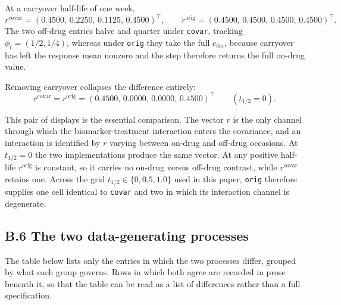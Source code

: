 \documentclass[
  11pt,
]{article}
\begin{document}
At a carryover half-life of one week,
\[
r^{\text{covar}} = (0.4500,\, 0.2250,\, 0.1125,\, 0.4500)^{\top},
\qquad
r^{\text{orig}} = (0.4500,\, 0.4500,\, 0.4500,\, 0.4500)^{\top}.
\]
The two off-drug entries halve and quarter under \texttt{covar},
tracking \(\phi_t = (1/2, 1/4)\), whereas under \texttt{orig} they take
the full \(c_{bm}\), because carryover has left the response mean
nonzero and the step therefore returns the full on-drug value.

Removing carryover collapses the difference entirely:
\[
r^{\text{covar}} = r^{\text{orig}} =
(0.4500,\, 0.0000,\, 0.0000,\, 0.4500)^{\top}
\qquad (t_{1/2} = 0).
\]

This pair of displays is the essential comparison. The vector \(r\) is
the only channel through which the biomarker-treatment interaction
enters the covariance, and an interaction is identified by \(r\) varying
between on-drug and off-drug occasions. At \(t_{1/2} = 0\) the two
implementations produce the same vector. At any positive half-life
\(r^{\text{orig}}\) is constant, so it carries no on-drug versus
off-drug contrast, while \(r^{\text{covar}}\) retains one. Across the
grid \(t_{1/2} \in \{0, 0.5, 1.0\}\) used in this paper, \texttt{orig}
therefore supplies one cell identical to \texttt{covar} and two in
which its interaction channel is degenerate.

\subsection{B.6 The two data-generating processes}

The table below lists only the entries in which the two processes
differ, grouped by what each group governs. Rows in which both
agree are recorded in prose beneath it, so that the table can be read
as a list of differences rather than a full specification.
\end{document}
